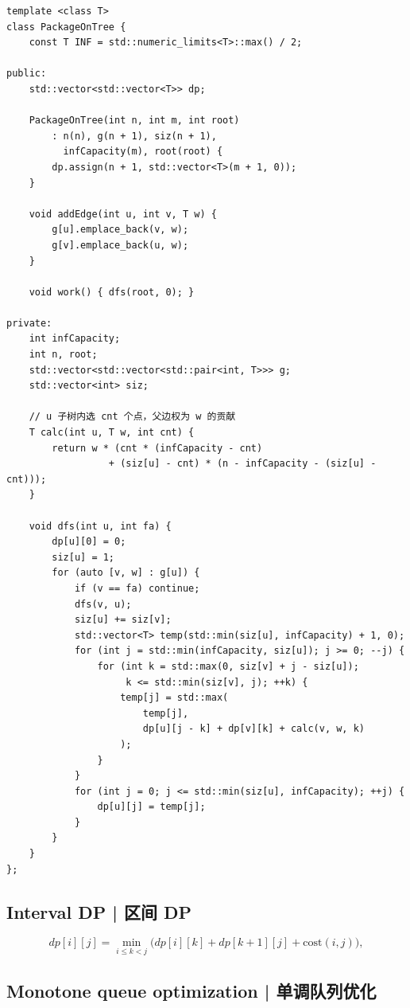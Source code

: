         \begin{lstlisting}
template <class T>
class PackageOnTree {
    const T INF = std::numeric_limits<T>::max() / 2;

public:
    std::vector<std::vector<T>> dp;

    PackageOnTree(int n, int m, int root)
        : n(n), g(n + 1), siz(n + 1),
          infCapacity(m), root(root) {
        dp.assign(n + 1, std::vector<T>(m + 1, 0));
    }

    void addEdge(int u, int v, T w) {
        g[u].emplace_back(v, w);
        g[v].emplace_back(u, w);
    }

    void work() { dfs(root, 0); }

private:
    int infCapacity;
    int n, root;
    std::vector<std::vector<std::pair<int, T>>> g;
    std::vector<int> siz;

    // u 子树内选 cnt 个点，父边权为 w 的贡献
    T calc(int u, T w, int cnt) {
        return w * (cnt * (infCapacity - cnt)
                  + (siz[u] - cnt) * (n - infCapacity - (siz[u] - cnt)));
    }

    void dfs(int u, int fa) {
        dp[u][0] = 0;
        siz[u] = 1;
        for (auto [v, w] : g[u]) {
            if (v == fa) continue;
            dfs(v, u);
            siz[u] += siz[v];
            std::vector<T> temp(std::min(siz[u], infCapacity) + 1, 0);
            for (int j = std::min(infCapacity, siz[u]); j >= 0; --j) {
                for (int k = std::max(0, siz[v] + j - siz[u]);
                     k <= std::min(siz[v], j); ++k) {
                    temp[j] = std::max(
                        temp[j],
                        dp[u][j - k] + dp[v][k] + calc(v, w, k)
                    );
                }
            }
            for (int j = 0; j <= std::min(siz[u], infCapacity); ++j) {
                dp[u][j] = temp[j];
            }
        }
    }
};
        \end{lstlisting}

\subsection{Interval DP | 区间 DP}

    \[
        dp[i][j] = \min_{i \le k < j} \bigl(dp[i][k] + dp[k+1][j] + \text{cost}(i,j)\bigr),
    \]

\subsection{Monotone queue optimization | 单调队列优化}


